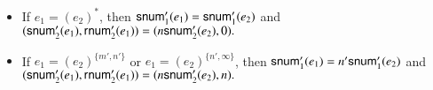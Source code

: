 \begin{itemize}
%
 \item If $e_1 = (e_2)^*$, then ${\sf snum}'_1(e_1) = {\sf snum}'_1(e_2)$ and 
%
  $
 ({\sf snum}'_2(e_1), {\sf rnum}'_2(e_1)) =  (n {\sf snum}'_2(e_2), 0).
  $
 \item If $e_1 = (e_2)^{\{m', n'\}}$ or $e_1 = (e_2)^{\{n', \infty\}}$, then ${\sf snum}'_1(e_1) = n' {\sf snum}'_1(e_2)$ and 
%
  $
 ({\sf snum}'_2(e_1), {\sf rnum}'_2(e_1)) =  (n {\sf snum}'_2(e_2), n).
  $
\end{itemize}


